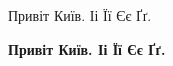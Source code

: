 \documentclass[10pt]{article}
\begin{document}
\noindent Привіт Київ. Іі Її Єє Ґґ.\par
\noindent \textbf{Привіт Київ. Іі Її Єє Ґґ.}
\end{document}
